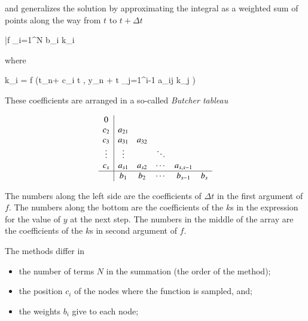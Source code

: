 \noindent and generalizes the solution by approximating the integral
as a weighted sum of points along the way from $t$ to $t+\Delta t$

\beq
\bar{f} \approx \sum_{i=1}^N b_i  k_i
\label{eq:barf}
\eeq


\noindent where

\beq
k_i = f \left(t_n+ c_i \Delta t ,  y_n + \Delta t \sum_{j=1}^{i-1} a_{ij} k_j \right) 
\eeq



These coefficients are arranged in a so-called {\it Butcher tableau}

\[
\begin{array}
{c|ccccc}
0\\
c_2 & a_{21}\\
c_3 &a_{31} &a_{32} \\
\vdots & \vdots & &\ddots \\ 
c_s& a_{s1}& a_{s2}& \cdots &a_{s,s-1}\\
\hline
& b_1 &b_2 &\cdots &b_{s-1} & b_s 
\end{array}
\]

The numbers along the left side are the coefficients of $\Delta t$ in
the first argument of $f$. The numbers along the bottom are the
coefficients of the $k$s in the expression for the value of $y$ at the
next step. The numbers in the middle of the array are the coefficients
of the $k$s in second argument  of $f$.







The methods differ in

\begin{itemize}
\item the number of terms $N$ in the summation (the order of the method);
\item the position $c_i$ of the nodes where the function is sampled,  and; 
\item the weights $b_i$ give to each node;
\end{itemize}


